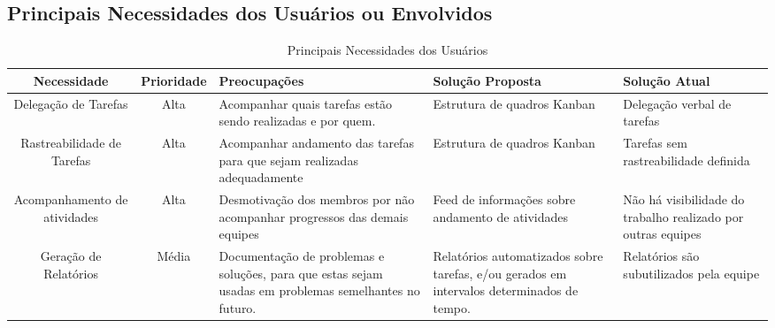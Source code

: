 \begin{apendicesenv}
\section{Principais Necessidades dos Usuários ou Envolvidos}
\begin{table}[!h]
  \centering
  \caption{Principais Necessidades dos Usuários}
  \begin{tabular}{|c|c|l|l|l|}
  \hline
  \textbf{Necessidade}         & \multicolumn{1}{l|}{\textbf{Prioridade}} & \textbf{Preocupações}                                                                                 & \textbf{Solução Proposta}                                                                 & \textbf{Solução Atual}                                                                                           \\ \hline
  \parbox[t]{3cm}{Delegação de Tarefas}         & Alta                                     & \parbox[t]{4cm}{Acompanhar quais tarefas estão sendo realizadas e por quem.}                                           & \parbox[t]{3.4cm}{Estrutura de quadros Kanban}                                                               & \parbox[t]{3cm}{Delegação verbal de tarefas}                                                                                      \\ \hline
  \parbox[t]{3cm}{Rastreabilidade de Tarefas}   & Alta                                     & \parbox[t]{4cm}{Acompanhar andamento das tarefas para que sejam realizadas adequadamente}                              & \parbox[t]{3.4cm}{Estrutura de quadros Kanban }                                                              & \parbox[t]{3cm}{Tarefas sem rastreabilidade definida}                                                                             \\ \hline
  \parbox[t]{3cm}{Acompanhamento de atividades} & Alta                                     & \parbox[t]{4cm}{Desmotivação dos membros por não acompanhar progressos das demais equipes}                             & \parbox[t]{3.4cm}{Feed de informações sobre andamento de atividades}                                         & \parbox[t]{3cm}{Não há visibilidade do trabalho realizado por outras equipes}                                                     \\ \hline
  \parbox[t]{3cm}{Geração de Relatórios}        & Média                                    & \parbox[t]{4cm}{Documentação de problemas e soluções, para que estas sejam usadas em problemas semelhantes no futuro.} & \parbox[t]{3.4cm}{Relatórios automatizados sobre tarefas, e/ou gerados em intervalos determinados de tempo.} & \parbox[t]{3cm}{Relatórios são subutilizados pela equipe}                                                                         \\ \hline

\end{tabular}
\end{table}
\end{apendicesenv}
